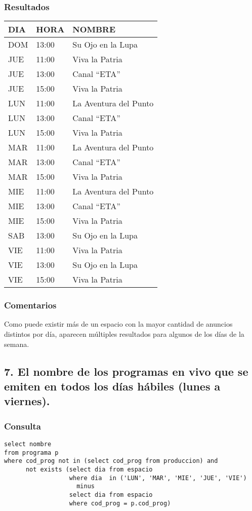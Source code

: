 \subsubsection*{Resultados}
\begin{tabular}{|l|l|l|}
  \hline
    \bf{DIA} & \bf{HORA} & \bf{NOMBRE} \\ 
  \hline
    DOM & 13:00 & Su Ojo en la Lupa \\ 
    JUE & 11:00 & Viva la Patria \\ 
    JUE & 13:00 & Canal ``ETA'' \\ 
    JUE & 15:00 & Viva la Patria \\ 
    LUN & 11:00 & La Aventura del Punto \\ 
    LUN & 13:00 & Canal ``ETA'' \\ 
    LUN & 15:00 & Viva la Patria \\ 
    MAR & 11:00 & La Aventura del Punto \\ 
    MAR & 13:00 & Canal ``ETA'' \\ 
    MAR & 15:00 & Viva la Patria \\ 
    MIE & 11:00 & La Aventura del Punto \\ 
    MIE & 13:00 & Canal ``ETA'' \\ 
    MIE & 15:00 & Viva la Patria \\ 
    SAB & 13:00 & Su Ojo en la Lupa \\ 
    VIE & 11:00 & Viva la Patria \\ 
    VIE & 13:00 & Su Ojo en la Lupa \\ 
    VIE & 15:00 & Viva la Patria \\ 
  \hline
\end{tabular} 

\subsubsection*{Comentarios}
Como puede existir más de un espacio con la mayor cantidad de anuncios distintos por día, aparecen múltiples resultados para algunos de los días de la semana.

\subsection*{7. \normalsize{El nombre de los programas en vivo que se emiten en todos los d\'ias h\'abiles (lunes a viernes).}}

\subsubsection*{Consulta}
\begin{lstlisting} 
select nombre 
from programa p
where cod_prog not in (select cod_prog from produccion) and
      not exists (select dia from espacio 
                  where dia  in ('LUN', 'MAR', 'MIE', 'JUE', 'VIE') 
                    minus
                  select dia from espacio 
                  where cod_prog = p.cod_prog)
\end{lstlisting}


